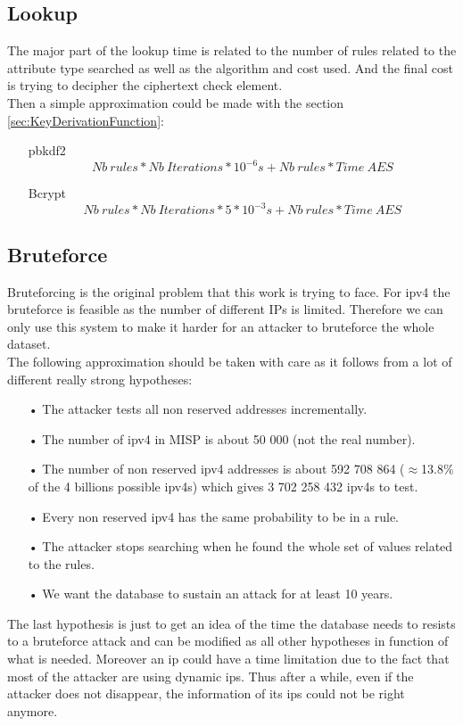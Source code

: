 \documentclass{eplmastersthesis}
\begin{document}
\subsection{Lookup}
The major part of the lookup time is related to the number of rules related to the attribute type searched as well as the algorithm and cost used. And the final cost is trying to decipher the ciphertext check element.\\

Then a simple approximation could be made with the section \ref{sec:KeyDerivationFunction}:
\begin{itemize}
\item[\gls{pbkdf2}] $$Nb\ rules * Nb\ Iterations * 10^{-6}s + Nb\ rules * Time\ AES$$
\item[Bcrypt]  $$Nb\ rules * Nb\ Iterations * 5 * 10^{-3}s + Nb\ rules * Time\ AES$$
\end{itemize}

\subsection{Bruteforce}
Bruteforcing is the original problem that this work is trying to face. For \gls{ipv4} the bruteforce is feasible as the number of different IPs is limited. Therefore we can only use this system to make it harder for an attacker to bruteforce the whole dataset.\\

The following approximation should be taken with care as it follows from a lot of different really strong hypotheses:
\begin{itemize}
\item[•] The attacker tests all non reserved addresses incrementally.
\item[•] The number of \gls{ipv4} in MISP is about 50 000 (not the real number).
\item[•] The number of non reserved \gls{ipv4} addresses is about 592 708 864 ($\approx$13.8\% of the 4 billions possible \gls{ipv4}s) which gives 3 702 258 432 \gls{ipv4}s to test.
\item[•] Every non reserved \gls{ipv4} has the same probability to be in a rule.
\item[•] The attacker stops searching when he found the whole set of values related to the rules.
\item[•] We want the database to sustain an attack for at least 10 years.
\end{itemize}
The last hypothesis is just to get an idea of the time the database needs to resists to a bruteforce attack and can be modified as all other hypotheses in function of what is needed.
Moreover an \gls{ip} could have a time limitation due to the fact that most of the attacker are using dynamic \gls{ip}s. Thus after a while, even if the attacker does not disappear, the information of its \gls{ip}s could not be right anymore.\\
\end{document}
